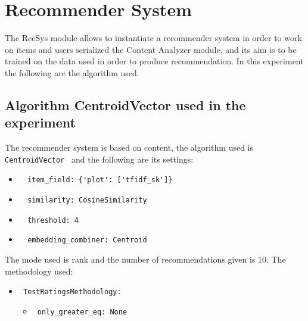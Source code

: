 \documentclass[11pt]{article}
\begin{document}
\section{Recommender System}\label{sec:recsys}
The RecSys module allows to instantiate a recommender system in order to work on items and users serialized
the Content Analyzer module, and its aim is to be trained on the data used in order to produce recommendation.
In this experiment the following are the algorithm used.



\subsection{Algorithm CentroidVector used in the experiment}\label{subsec:algo_CentroidVector}

The recommender system is based on content, the algorithm used
is \verb| CentroidVector | and the following are its settings:
\begin{itemize}
\item \begin{verbatim}
  item_field: {'plot': ['tfidf_sk']}
\end{verbatim}
\item \begin{verbatim}
  similarity: CosineSimilarity
\end{verbatim}
\item \begin{verbatim}
  threshold: 4
\end{verbatim}
\item \begin{verbatim}
  embedding_combiner: Centroid
\end{verbatim}
\end{itemize}
\hfill\break
The mode used is rank and the number of recommendations given
is 10.
The methodology used:
\begin{itemize}
    \item \verb| TestRatingsMethodology:|
    \begin{itemize}
                    \item \verb| only_greater_eq: None |
            \end{itemize}
\end{itemize}
\hfill\break
\end{document}
